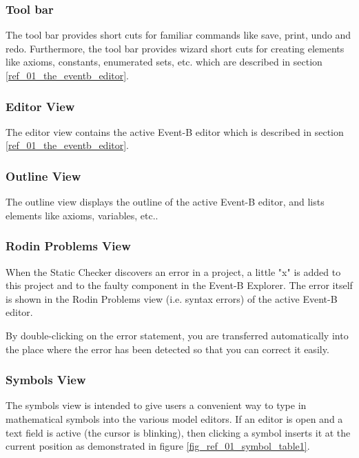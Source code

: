 \subsubsection{Tool bar}

The tool bar provides short cuts for familiar commands like save, print, undo and redo. Furthermore, the tool bar provides wizard short cuts for creating elements like axioms, constants, enumerated sets, etc. which are described in section \ref{ref_01_the_eventb_editor}.

\subsubsection{Editor View}

The editor view contains the active Event-B editor which is described in section \ref{ref_01_the_eventb_editor}.

\subsubsection{Outline View}

The outline view displays the outline of the active Event-B editor, and lists elements like axioms, variables, etc.. 

\subsubsection{Rodin Problems View}

When the Static Checker discovers an error in a project, a little "x" is added to this project and to the faulty component in the \textsf{Event-B Explorer}. The error itself is shown in the Rodin Problems view (i.e. syntax errors) of the active Event-B editor.

By double-clicking on the error statement, you are transferred automatically into the place where the error has been detected so that you can correct it easily.

\subsubsection{Symbols View}
\label{reference_01_symbols_view}

The symbols view is intended to give users a convenient way to type in mathematical symbols into the various model editors. If an editor is open and a text field is active (the cursor is blinking), then clicking a symbol inserts it at the current position as demonstrated in figure \ref{fig_ref_01_symbol_table1}. 

